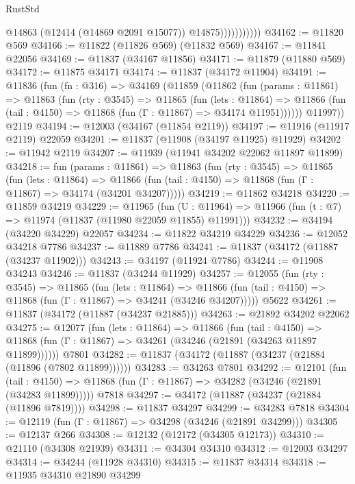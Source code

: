 \begin{lexlean}{RustStd}
\begin{coremodule}
                          @14863
                          (@12414 (@14869 @2091 @15077))
                          @14875)))))))))))
@34162 := @11820 @569
@34166 := @11822 (@11826 @569) (@11832 @569)
@34167 := @11841 @22056
@34169 := @11837 (@34167 @11856)
@34171 := @11879 (@11880 @569)
@34172 := @11875 @34171
@34174 := @11837 (@34172 @11904)
@34191 := @11836
    (fun (fn : @316) =>
    @34169
      (@11859
        (@11862
          (fun (params : @11861) =>
          @11863
            (fun (rty : @3545) =>
            @11865
              (fun (lets : @11864) =>
              @11866 (fun (tail : @4150) => @11868 (fun (Γ : @11867) => @34174 @11951))))))
        @11997))
    @2119
@34194 := @12003 (@34167 (@11854 @2119))
@34197 := @11916 (@11917 @2119) @22059
@34201 := @11837 (@11908 (@34197 @11925) @11929)
@34202 := @11942 @2119
@34207 := @11939 (@11941 @34202 @22062 @11897 @11899)
@34218 := fun (params : @11861) =>
  @11863
    (fun (rty : @3545) =>
    @11865
      (fun (lets : @11864) =>
      @11866 (fun (tail : @4150) => @11868 (fun (Γ : @11867) => @34174 (@34201 @34207)))))
@34219 := @11862 @34218
@34220 := @11859 @34219
@34229 := @11965
    (fun (U : @11964) => @11966 (fun (t : @7) => @11974 (@11837 (@11980 @22059 @11855) @11991)))
@34232 := @34194 (@34220 @34229) @22057
@34234 := @11822 @34219 @34229
@34236 := @12052 @34218 @7786
@34237 := @11889 @7786
@34241 := @11837 (@34172 (@11887 (@34237 @11902)))
@34243 := @34197 (@11924 @7786)
@34244 := @11908 @34243
@34246 := @11837 (@34244 @11929)
@34257 := @12055
    (fun (rty : @3545) =>
    @11865
      (fun (lets : @11864) =>
      @11866 (fun (tail : @4150) => @11868 (fun (Γ : @11867) => @34241 (@34246 @34207)))))
    @5622
@34261 := @11837 (@34172 (@11887 (@34237 @21885)))
@34263 := @21892 @34202 @22062
@34275 := @12077
    (fun (lets : @11864) =>
    @11866
      (fun (tail : @4150) =>
      @11868 (fun (Γ : @11867) => @34261 (@34246 (@21891 (@34263 @11897 @11899))))))
    @7801
@34282 := @11837 (@34172 (@11887 (@34237 (@21884 (@11896 (@7802 @11899))))))
@34283 := @34263 @7801
@34292 := @12101
    (fun (tail : @4150) => @11868 (fun (Γ : @11867) => @34282 (@34246 (@21891 (@34283 @11899)))))
    @7818
@34297 := @34172 (@11887 (@34237 (@21884 (@11896 @7819))))
@34298 := @11837 @34297
@34299 := @34283 @7818
@34304 := @12119 (fun (Γ : @11867) => @34298 (@34246 (@21891 @34299)))
@34305 := @12137 @266
@34308 := @12132 (@12172 (@34305 @12173))
@34310 := @21110 (@34308 @21939)
@34311 := @34304 @34310
@34312 := @12003 @34297
@34314 := @34244 (@11928 @34310)
@34315 := @11837 @34314
@34318 := @11935 @34310 @21890 @34299

\end{coremodule}
\end{lexlean}
